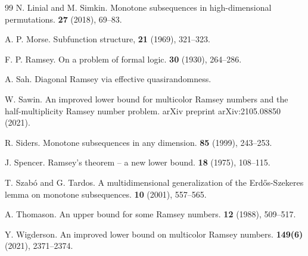 \begin{thebibliography}{99}
 N. Linial and M. Simkin. \newblock Monotone subsequences in high-dimensional permutations.  \textbf{27} (2018), 69--83.

A. P. Morse. \newblock Subfunction structure,  \textbf{21} (1969), 321--323.


F. P. Ramsey. \newblock On a problem of formal logic.  {\bf 30} (1930), 264--286.

 A. Sah. \newblock Diagonal Ramsey via effective quasirandomness. 

W. Sawin. \newblock An improved lower bound for multicolor Ramsey numbers and the half-multiplicity Ramsey number problem. \newblock arXiv preprint arXiv:2105.08850 (2021).

R. Siders. \newblock Monotone subsequences in any dimension.  \textbf{85} (1999), 243--253.

%
%
%


 J. Spencer. \newblock Ramsey's theorem -- a new lower bound.  \textbf{18} (1975),
108--115.



T. Szab\'o and G. Tardos. \newblock A multidimensional generalization of the Erd\H{o}s-Szekeres lemma on monotone
subsequences.  \textbf{10} (2001), 557--565.

A. Thomason. \newblock An upper bound for some Ramsey numbers. \textbf{12} (1988), 509--517.

Y. Wigderson. \newblock An improved lower bound on multicolor Ramsey numbers.  \textbf{149(6)} (2021), 2371--2374.


\end{thebibliography}
